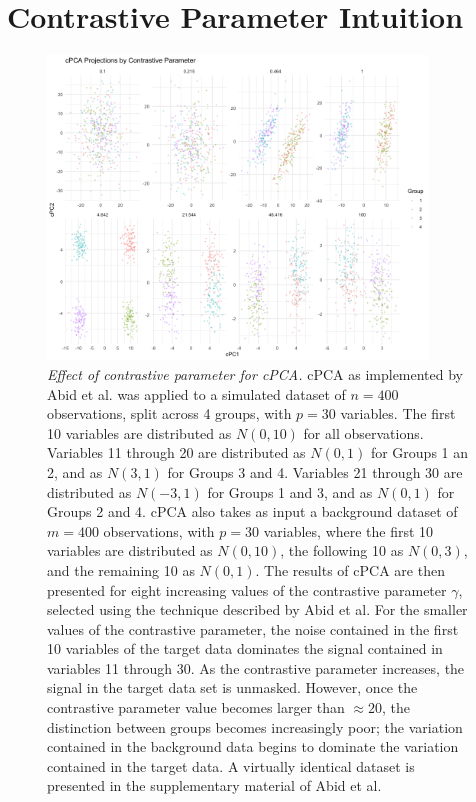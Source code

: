 \documentclass{article}
\begin{document}
\FloatBarrier

\newpage

\section{Contrastive Parameter Intuition}

\begin{figure}[!htbp]
    \centering
    \includegraphics[width=0.9\textwidth]{figures/cpca_example_plot}
    \caption{
    {\em Effect of contrastive parameter for cPCA.}
    cPCA as implemented by Abid et al. was applied to a simulated dataset of $n=400$ observations, split across 4 groups, with $p=30$ variables. The first 10 variables are distributed as $N(0, 10)$ for all observations. Variables 11
    through 20 are distributed as $N(0, 1)$ for Groups 1 an 2, and as $N(3, 1)$
    for Groups 3 and 4. Variables 21 through 30 are distributed as $N(-3, 1)$
    for Groups 1 and 3, and as $N(0, 1)$ for Groups 2 and 4. cPCA also takes
    as input a background dataset of $m=400$ observations, with $p=30$
    variables, where the first 10 variables are distributed as $N(0, 10)$, the
    following 10 as $N(0, 3)$, and the remaining 10 as $N(0, 1)$. The results
    of cPCA are then presented for eight increasing values of the contrastive
    parameter $\gamma$, selected using the technique described by Abid et al. For the smaller values of the contrastive parameter, the
    noise contained in the first 10 variables of the target data dominates the
    signal contained in variables 11 through 30. As the contrastive parameter
    increases, the signal in the target data set is unmasked. However, once the
    contrastive parameter value becomes larger than $\approx 20$, the
    distinction between groups becomes increasingly poor; the variation
    contained in the background data begins to dominate the variation contained
    in the target data. A virtually identical dataset is presented in the
    supplementary material of Abid et al. }
    \label{fig:contrastive_par}
\end{figure}
\end{document}
